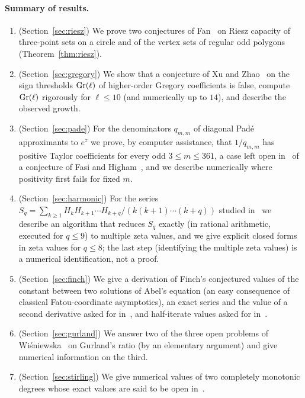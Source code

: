 \paragraph{Summary of results.}
\begin{enumerate}[leftmargin=2em]
\item (Section~\ref{sec:riesz}) We prove two conjectures of Fan~\cite{Fan} on Riesz capacity of three-point sets on a circle and of the vertex sets of regular odd polygons (Theorem~\ref{thm:riesz}).
\item (Section~\ref{sec:gregory}) We show that a conjecture of Xu and Zhao~\cite{XZ} on the sign thresholds $\mathrm{Gr}(\ell)$ of higher-order Gregory coefficients is false, compute $\mathrm{Gr}(\ell)$ rigorously for $\ell\le10$ (and numerically up to $14$), and describe the observed growth.
\item (Section~\ref{sec:pade}) For the denominators $q_{m,m}$ of diagonal Pad\'e approximants to $e^z$ we prove, by computer assistance, that $1/q_{m,m}$ has positive Taylor coefficients for every odd $3\le m\le361$, a case left open in~\cite{Scardino} of a conjecture of Fasi and Higham~\cite{FH}, and we describe numerically where positivity first fails for fixed $m$.
\item (Section~\ref{sec:harmonic}) For the series $S_q=\sum_{k\ge1}H_kH_{k+1}\cdots H_{k+q}/(k(k+1)\cdots(k+q))$ studied in~\cite{CN} we describe an algorithm that reduces $S_q$ exactly (in rational arithmetic, executed for $q\le9$) to multiple zeta values, and we give explicit closed forms in zeta values for $q\le8$; the last step (identifying the multiple zeta values) is a numerical identification, not a proof.
\item (Section~\ref{sec:finch}) We give a derivation of Finch's conjectured values of the constant between two solutions of Abel's equation (an easy consequence of classical Fatou-coordinate asymptotics), an exact series and the value of a second derivative asked for in~\cite{FinchIII}, and half-iterate values asked for in~\cite{FinchIV}.
\item (Section~\ref{sec:gurland}) We answer two of the three open problems of Wi\'sniewska~\cite{Wis} on Gurland's ratio (by an elementary argument) and give numerical information on the third.
\item (Section~\ref{sec:stirling}) We give numerical values of two completely monotonic degrees whose exact values are said to be open in~\cite{Kr}.
\end{enumerate}

